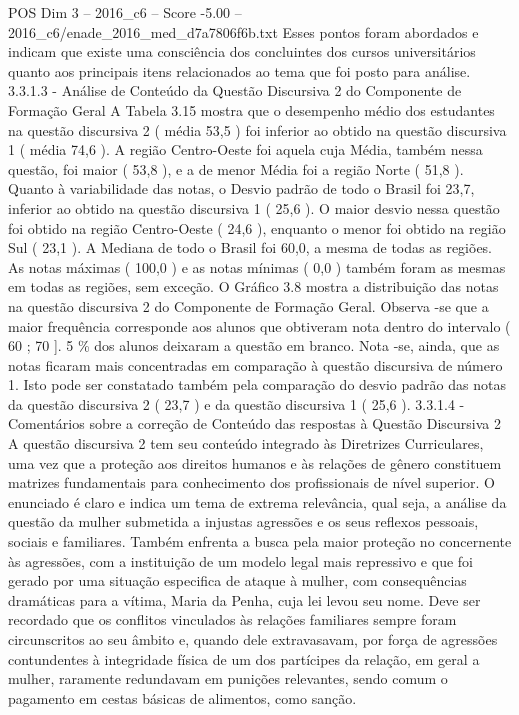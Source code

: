 \begin{textsample}{POS Dim 3 – 2016\_c6 – Score -5.00 – 2016\_c6/enade\_2016\_med\_d7a7806f6b.txt}
Esses pontos foram abordados e indicam que existe uma consciência dos concluintes dos cursos universitários quanto aos principais itens relacionados ao tema que foi posto para análise. 3.3.1.3 - Análise de Conteúdo da Questão Discursiva 2 do Componente de Formação Geral A Tabela 3.15 mostra que o desempenho médio dos estudantes na questão discursiva 2 ( média 53,5 ) foi inferior ao obtido na questão discursiva 1 ( média 74,6 ).
A região Centro-Oeste foi aquela cuja Média, também nessa questão, foi maior ( 53,8 ), e a de menor Média foi a região Norte ( 51,8 ).
Quanto à variabilidade das notas, o Desvio padrão de todo o Brasil foi 23,7, inferior ao obtido na questão discursiva 1 ( 25,6 ).
O maior desvio nessa questão foi obtido na região Centro-Oeste ( 24,6 ), enquanto o menor foi obtido na região Sul ( 23,1 ).
A Mediana de todo o Brasil foi 60,0, a mesma de todas as regiões.
As notas máximas ( 100,0 ) e as notas mínimas ( 0,0 ) também foram as mesmas em todas as regiões, sem exceção.
O Gráfico 3.8 mostra a distribuição das notas na questão discursiva 2 do Componente de Formação Geral.
Observa -se que a maior frequência corresponde aos alunos que obtiveram nota dentro do intervalo ( 60 ; 70 ]. 5 \% dos alunos deixaram a questão em branco.
Nota -se, ainda, que as notas ficaram mais concentradas em comparação à questão discursiva de número 1.
Isto pode ser constatado também pela comparação do desvio padrão das notas da questão discursiva 2 ( 23,7 ) e da questão discursiva 1 ( 25,6 ). 3.3.1.4 - Comentários sobre a correção de Conteúdo das respostas à Questão Discursiva 2 A questão discursiva 2 tem seu conteúdo integrado às Diretrizes Curriculares, uma vez que a proteção aos direitos humanos e às relações de gênero constituem matrizes fundamentais para conhecimento dos profissionais de nível superior.
O enunciado é claro e indica um tema de extrema relevância, qual seja, a análise da questão da mulher submetida a injustas agressões e os seus reflexos pessoais, sociais e familiares.
Também enfrenta a busca pela maior proteção no concernente às agressões, com a instituição de um modelo legal mais repressivo e que foi gerado por uma situação especifica de ataque à mulher, com consequências dramáticas para a vítima, Maria da Penha, cuja lei levou seu nome.
Deve ser recordado que os conflitos vinculados às relações familiares sempre foram circunscritos ao seu âmbito e, quando dele extravasavam, por força de agressões contundentes à integridade física de um dos partícipes da relação, em geral a mulher, raramente redundavam em punições relevantes, sendo comum o pagamento em cestas básicas de alimentos, como sanção.

\end{textsample}
